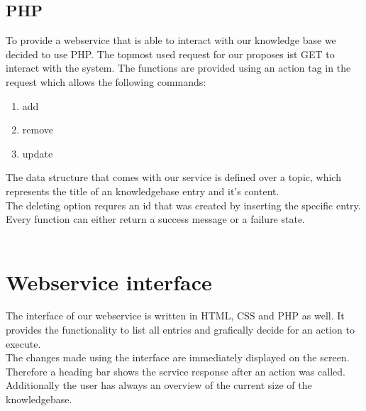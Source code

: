 \documentclass[12pt]{article}
\begin{document}
\subsection{PHP}
To provide a webservice that is able to interact with our knowledge base we decided to use PHP. The topmost used request for our proposes ist GET to interact with the system. The functions are provided using an action tag in the request which allows the following commands:
\begin{enumerate}
	\item add
	\item remove
	\item update
\end{enumerate}
The data structure that comes with our service is defined over a topic, which represents the title of an knowledgebase entry and it's content.\\
The deleting option requres an id that was created by inserting the specific entry.\\
Every function can either return a success message or a failure state.\\
\\
\section{Webservice interface}
The interface of our webservice is written in HTML, CSS and PHP as well. It provides the functionality to list all entries and grafically decide for an action to execute.\\
The changes made using the interface are immediately displayed on the screen. Therefore a heading bar shows the service response after an action was called. Additionally the user has always an overview of the current size of the knowledgebase.
\end{document}
